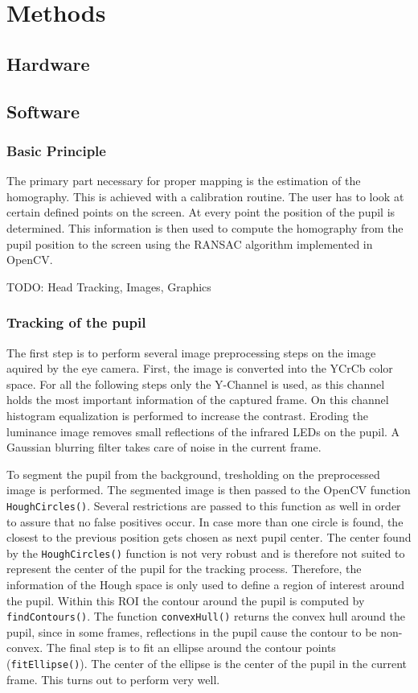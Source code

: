 \section{Methods}\label{methods}

\subsection{Hardware}

\subsection{Software}

\subsubsection{Basic Principle}
The primary part necessary for proper mapping is the estimation of the homography. 
This is achieved with a calibration routine. The user has to look at certain defined points on the screen. 
At every point the position of the pupil is determined. 
This information is then used to compute the homography from the pupil position to the screen using the RANSAC algorithm implemented in OpenCV. 

TODO: Head Tracking, Images, Graphics

\subsubsection{Tracking of the pupil}
The first step is to perform several image preprocessing steps on the image aquired by the eye camera. First, the image is converted into the YCrCb color space.
For all the following steps only the Y-Channel is used, as this channel holds the most important information of the captured frame.
On this channel histogram equalization is performed to increase the contrast. 
Eroding the luminance image removes small reflections of the infrared LEDs on the pupil. 
A Gaussian blurring filter takes care of noise in the current frame. 

To segment the pupil from the background, tresholding on the preprocessed image is performed. 
The segmented image is then passed to the OpenCV function \texttt{HoughCircles()}. 
Several restrictions are passed to this function as well in order to assure that no false positives occur. 
In case more than one circle is found, the closest to the previous position gets chosen as next pupil center.
The center found by the \texttt{HoughCircles()} function is not very robust and is therefore not suited to represent the center of the pupil for the tracking process.
Therefore, the information of the Hough space is only used to define a region of interest around the pupil. 
Within this ROI the contour around the pupil is computed by \texttt{findContours()}. 
The function \texttt{convexHull()} returns the convex hull around the pupil, since in some frames, reflections in the pupil cause the contour to be non-convex.
The final step is to fit an ellipse around the contour points (\texttt{fitEllipse()}).
The center of the ellipse is the center of the pupil in the current frame. 
This turns out to perform very well. 

